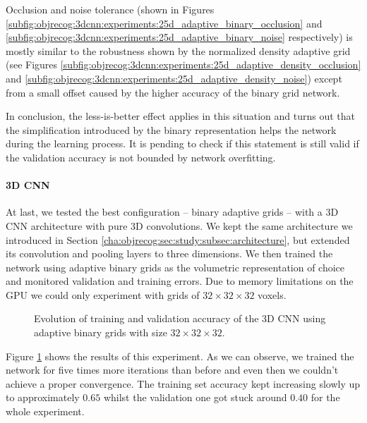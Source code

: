 Occlusion and noise tolerance (shown in Figures \ref{subfig:objrecog:3dcnn:experiments:25d_adaptive_binary_occlusion} and \ref{subfig:objrecog:3dcnn:experiments:25d_adaptive_binary_noise} respectively) is mostly similar to the robustness shown by the normalized density adaptive grid (see Figures \ref{subfig:objrecog:3dcnn:experiments:25d_adaptive_density_occlusion} and \ref{subfig:objrecog:3dcnn:experiments:25d_adaptive_density_noise}) except from a small offset caused by the higher accuracy of the binary grid network.

In conclusion, the less-is-better effect applies in this situation and turns out that the simplification introduced by the binary representation helps the network during the learning process. It is pending to check if this statement is still valid if the validation accuracy is not bounded by network overfitting.

\paragraph{3D \ac{CNN}}

At last, we tested the best configuration -- binary adaptive grids -- with a \acs{3D} \acs{CNN} architecture with pure \acs{3D} convolutions. We kept the same architecture we introduced in Section \ref{cha:objrecog:sec:study:subsec:architecture}, but extended its convolution and pooling layers to three dimensions. We then trained the network using adaptive binary grids as the volumetric representation of choice and monitored validation and training errors. Due to memory limitations on the \acs{GPU} we could only experiment with grids of $32\times32\times32$ voxels.

\begin{figure}[!hbt]
	\centering
	
	\caption{Evolution of training and validation accuracy of the \acs{3D} \acs{CNN} using adaptive binary grids with size $32\times32\times32$.}
	\label{fig:objrecog:3dcnn:experiments:3d}
\end{figure}

\clearpage

Figure \ref{fig:objrecog:3dcnn:experiments:3d} shows the results of this experiment. As we can observe, we trained the network for five times more iterations than before and even then we couldn't achieve a proper convergence. The training set accuracy kept increasing slowly up to approximately $0.65$ whilst the validation one got stuck around $0.40$ for the whole experiment.

